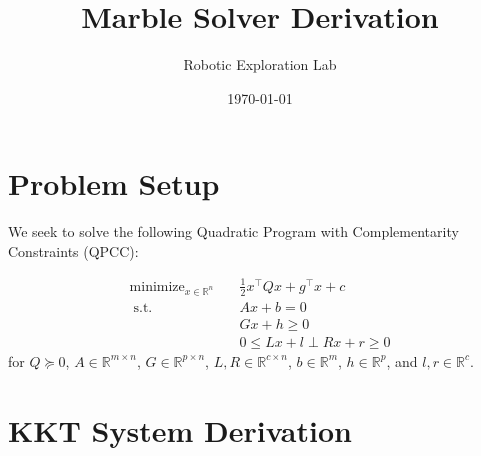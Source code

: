 \documentclass[11pt]{article}
\title{Marble Solver Derivation}
\author{Robotic Exploration Lab}
\date{\today}
\theoremstyle{plain}
\theoremstyle{definition}
\theoremstyle{remark}
\newcommand{\R}{\mathbb{R}}
\newcommand{\st}{\;\text{s.t.}\;}
\DeclareMathOperator*{\minimize}{minimize}
\begin{document}
\maketitle

\section{Problem Setup}

We seek to solve the following Quadratic Program with Complementarity Constraints (QPCC):

\begin{equation}\label{qpcc}
\begin{aligned}
\minimize_{x \in \R^n} \quad & \frac12 x^\top Q x + g^\top x + c \\
\st \quad & Ax + b = 0 \\
          & Gx + h \geq 0 \\
          & 0 \leq Lx + l \perp Rx + r \geq 0
\end{aligned}
\end{equation}
for $Q \succeq 0$, $A \in \R^{m \times n}$, $G \in \R^{p \times n}$, $L, R \in \R^{c \times n}$, $b \in \R^m$, $h \in \R^p$, and $l, r \in \R^c$.

\section{KKT System Derivation}
\end{document}
